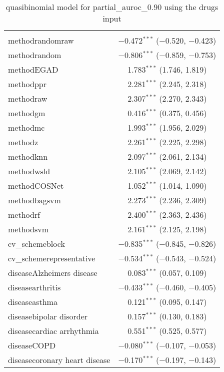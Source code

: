 
\begin{table}[!htbp] \centering 
  \caption{quasibinomial model for partial_auroc_0.90 using the drugs input} 
  \label{} 
\begin{tabular}{@{\extracolsep{5pt}}lc} 
\\[-1.8ex]\hline 
\hline \\[-1.8ex] 
 methodrandomraw & $-$0.472$^{***}$ ($-$0.520, $-$0.423) \\ 
  methodrandom & $-$0.806$^{***}$ ($-$0.859, $-$0.753) \\ 
  methodEGAD & 1.783$^{***}$ (1.746, 1.819) \\ 
  methodppr & 2.281$^{***}$ (2.245, 2.318) \\ 
  methodraw & 2.307$^{***}$ (2.270, 2.343) \\ 
  methodgm & 0.416$^{***}$ (0.375, 0.456) \\ 
  methodmc & 1.993$^{***}$ (1.956, 2.029) \\ 
  methodz & 2.261$^{***}$ (2.225, 2.298) \\ 
  methodknn & 2.097$^{***}$ (2.061, 2.134) \\ 
  methodwsld & 2.105$^{***}$ (2.069, 2.142) \\ 
  methodCOSNet & 1.052$^{***}$ (1.014, 1.090) \\ 
  methodbagsvm & 2.273$^{***}$ (2.236, 2.309) \\ 
  methodrf & 2.400$^{***}$ (2.363, 2.436) \\ 
  methodsvm & 2.161$^{***}$ (2.125, 2.198) \\ 
  cv\_schemeblock & $-$0.835$^{***}$ ($-$0.845, $-$0.826) \\ 
  cv\_schemerepresentative & $-$0.534$^{***}$ ($-$0.543, $-$0.524) \\ 
  diseaseAlzheimers disease & 0.083$^{***}$ (0.057, 0.109) \\ 
  diseasearthritis & $-$0.433$^{***}$ ($-$0.460, $-$0.405) \\ 
  diseaseasthma & 0.121$^{***}$ (0.095, 0.147) \\ 
  diseasebipolar disorder & 0.157$^{***}$ (0.130, 0.183) \\ 
  diseasecardiac arrhythmia & 0.551$^{***}$ (0.525, 0.577) \\ 
  diseaseCOPD & $-$0.080$^{***}$ ($-$0.107, $-$0.053) \\ 
  diseasecoronary heart disease & $-$0.170$^{***}$ ($-$0.197, $-$0.143) \\ 

\end{tabular}
\end{table}
